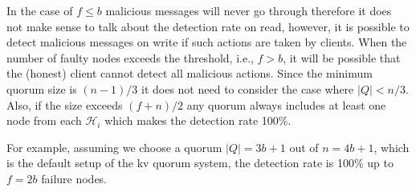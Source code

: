 In the case of $f \le b$ malicious messages will never go through
therefore it does not make sense to talk about the detection rate on
{\sf read}, however, it is possible to detect malicious messages on
{\sf write} if such actions are taken by clients.
When the number of faulty nodes exceeds the threshold, i.e., $f > b$,
it will be possible that the (honest) client cannot detect all
malicious actions. Since the minimum quorum size is $(n-1)/3$ it does
not need to consider the case where $|Q| < n/3$. Also, if the size
exceeds $(f+n)/2$ any quorum always includes at least one node from
each $\mathcal{H}_i$ which makes the detection rate 100\%.

\ifdefined\ABSTRACT
\else
{}
\fi

For example, assuming we choose a quorum $|Q| = 3b+1$ out of $n = 4b+1$,
which is the default setup of the kv quorum system, the detection rate
is 100\% up to $f = 2b$ failure nodes.

\ifdefined\ABSTRACT
\else
{}
\fi
